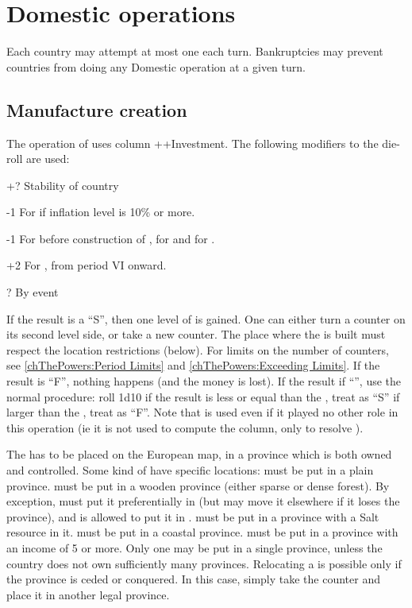 \section{Domestic operations}\label{chAdministration:Domestic}

\aparag Each country may attempt at most one  each
turn.
\bparag Bankruptcies may prevent countries from doing any Domestic operation
at a given turn.



\subsection{Manufacture creation}

\aparag The operation of  uses column
\ADM++Investment.
\bparag The following modifiers to the die-roll are used:
\begin{modlist}
\item[+?]Stability of country
\item[-1]For \SPA if inflation level is 10\% or more.
\item[-1]For \RUS before construction of , for \TUR
  and for \POL.
\item[+2]For \ENG, from period VI onward.
\item[\textplusminus?]By event
\end{modlist}
\bparag If the result is a ``S'', then one level of \MNU is gained. One can
either turn a counter on its second level side, or take a new \MNU counter.
\bparag The place where the \MNU is built must respect the location
restrictions (below).
\bparag For limits on the number of counters, see \ref{chThePowers:Period
  Limits} and \ref{chThePowers:Exceeding Limits}.
\bparag If the result is ``F'', nothing happens (and the money is lost).
\bparag If the result if ``\undemi'', use the normal procedure: roll 1d10 if
the result is less or equal than the \FTI, treat as ``S'' if larger than the
\FTI, treat as ``F''. Note that \FTI is used even if it played no other role
in this operation (ie it is not used to compute the column, only to resolve
\undemi).

\label{chAdministration:Manufacture Placement} The \MNU
has to be placed on the European map, in a province which is both owned and
controlled. Some kind of \MNU have specific locations:
\bparag {} \MNU must be put in a plain province.
\bparag {} \MNU must be put in a wooden province (either sparse or
dense forest). By exception, \ENG must put it preferentially in
 (but may move it elsewhere if it loses the province), and
\TUR is allowed to put it in .
\bparag {} \MNU must be put in a province with a Salt resource in it.
\bparag {} \MNU must be put in a coastal province.
\bparag {} \MNU must be put in a province with an income of 5 or more.
\bparag Only one \MNU may be put in a single province, unless the country does
not own sufficiently many provinces.
\bparag Relocating a \MNU is possible only if the province is ceded or
conquered. In this case, simply take the counter and place it in another legal
province.

